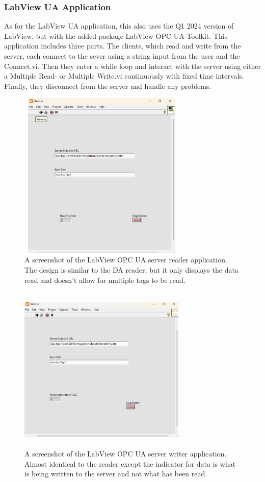 \documentclass[11pt, A4paper, english]{article}
\begin{document}
			\subsubsection{LabView UA Application}
As for the LabView UA application, this also uses the Q1 2024 version of LabView, but with the added package LabView OPC UA Toolkit. This application includes three parts. The clients, which read and write from the server, each connect to the sever using a string input from the user and the Connect.vi. Then they enter a while loop and interact with the server using either a Multiple Read- or Multiple Write.vi continuously with fixed time intervals. Finally, they disconnect from the server and handle any problems.
				\begin{figure}
\includegraphics[width=8cm, height=8cm]{Labview OPC UA/Client/Read_Screenshot.png}
\caption{A screenshot of the LabView OPC UA server reader application. The design is similar to the DA reader, but it only displays the data read and doesn't allow for multiple tags to be read.}
\label{im:L_UA_R}
				\end{figure}
				\begin{figure}
\includegraphics[width=8cm, height=8cm]{Labview OPC UA/Client/Write_Screenshot.png}
\caption{A screenshot of the LabView OPC UA server writer application. Almost identical to the reader except the indicator for data is what is being written to the server and not what has been read.}
\label{im:L_UA_W}
				\end{figure}
\end{document}
